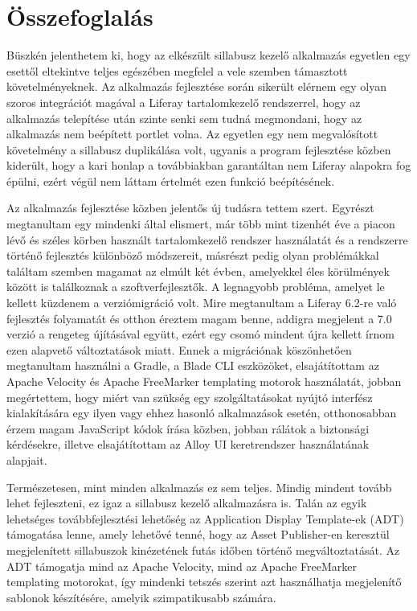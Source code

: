 \documentclass[hidelinks, 12pt, a4paper]{report}
\begin{document}
\chapter{Összefoglalás}

Büszkén jelenthetem ki, hogy az elkészült sillabusz kezelő alkalmazás egyetlen egy esettől eltekintve teljes egészében megfelel a vele szemben támasztott követelményeknek. Az alkalmazás fejlesztése során sikerült elérnem egy olyan szoros integrációt magával a Liferay tartalomkezelő rendszerrel, hogy az alkalmazás telepítése után szinte senki sem tudná megmondani, hogy az alkalmazás nem beépített portlet volna. Az egyetlen egy nem megvalósított követelmény a sillabusz duplikálása volt, ugyanis a program fejlesztése közben kiderült, hogy a kari honlap a továbbiakban garantáltan nem Liferay alapokra fog épülni, ezért végül nem láttam értelmét ezen funkció beépítésének.

Az alkalmazás fejlesztése közben jelentős új tudásra tettem szert. Egyrészt megtanultam egy mindenki által elismert, már több mint tizenhét éve a piacon lévő és széles körben használt tartalomkezelő rendszer használatát és a rendszerre történő fejlesztés különböző módszereit, másrészt pedig olyan problémákkal találtam szemben magamat az elmúlt két évben, amelyekkel éles körülmények között is találkoznak a szoftverfejlesztők. A legnagyobb probléma, amelyet le kellett küzdenem a verziómigráció volt. Mire megtanultam a Liferay 6.2-re való fejlesztés folyamatát és otthon éreztem magam benne, addigra megjelent a 7.0 verzió a rengeteg újításával együtt, ezért egy csomó mindent újra kellett írnom ezen alapvető változtatások miatt. Ennek a migrációnak köszönhetően megtanultam használni a Gradle, a Blade CLI eszközöket, elsajátítottam az Apache Velocity és Apache FreeMarker templating motorok \cite{apache-velocity} használatát, jobban megértettem, hogy miért van szükség egy szolgáltatásokat nyújtó interfész kialakítására egy ilyen vagy ehhez hasonló alkalmazások esetén, otthonosabban érzem magam JavaScript kódok írása közben, jobban rálátok a biztonsági kérdésekre, illetve elsajátítottam az Alloy UI keretrendszer \cite{alloyui} használatának alapjait.

Természetesen, mint minden alkalmazás ez sem teljes. Mindig mindent tovább lehet fejleszteni, ez igaz a sillabusz kezelő alkalmazásra is. Talán az egyik lehetséges továbbfejlesztési lehetőség az Application Display Template-ek (ADT) támogatása lenne, amely lehetővé tenné, hogy az Asset Publisher-en keresztül megjelenített sillabuszok kinézetének futás időben történő megváltoztatását. Az ADT támogatja mind az Apache Velocity, mind az Apache FreeMarker templating \cite{apache-velocity, apache-freemarker} motorokat, így mindenki tetszés szerint azt használhatja megjelenítő sablonok készítésére, amelyik szimpatikusabb számára.
\end{document}
